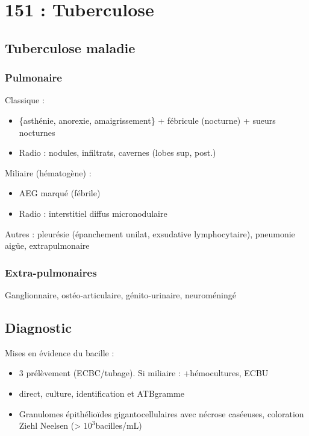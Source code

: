 \documentclass{article}
\begin{document}
\section{151 : Tuberculose}
\subsection{Tuberculose maladie}
\subsubsection{Pulmonaire}
Classique : 
\begin{itemize}
\item \{asthénie, anorexie, amaigrissement\} + fébricule (nocturne) + sueurs nocturnes
\item Radio : nodules, infiltrats, cavernes (lobes sup, post.)
\end{itemize}
Miliaire (hématogène) :
\begin{itemize}
\item AEG marqué (fébrile)
\item Radio : interstitiel diffus micronodulaire
\end{itemize}
Autres : pleurésie (épanchement unilat, exsudative lymphocytaire), pneumonie
aigüe, extrapulmonaire
\subsubsection{Extra-pulmonaires}
Ganglionnaire, ostéo-articulaire, génito-urinaire, neuroméningé
\subsection{Diagnostic}
Mises en évidence du bacille :
\begin{itemize}
\item 3 prélèvement (ECBC/tubage). Si miliaire : +hémocultures, ECBU
\item direct, culture, identification et ATBgramme
\item Granulomes épithélioïdes gigantocellulaires avec nécrose caséeuses,
  coloration Ziehl Neelsen (> $10^3$bacilles/mL)
\end{itemize}
\end{document}
